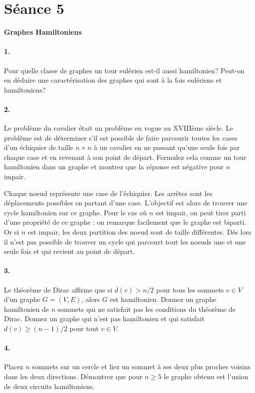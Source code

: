 \section{Séance 5}

\textbf{Graphes Hamiltoniens}

\paragraph{1. } Pour quelle classe de graphes un tour eulérien est-il aussi hamiltonien? Peut-on en déduire une caractérisation des graphes qui sont à la fois eulériens et hamiltoniens?

\paragraph{2. } Le problème du cavalier était un problème en vogue au XVIIIème siècle. Le problème est de déterminer s'il est possible de faire parcourir toutes les cases d'un échiquier de taille $n \times n$ à un cavalier en ne passant qu'une seule fois par chaque case et en revenant à son point de départ. Formulez cela comme un tour hamiltonien dans un graphe et montrez que la réponse est négative pour $n$ impair.
\begin{solution}
Chaque noeud représente une case de l'échiquier. Les arrêtes sont les déplacements possibles en partant d'une case. L'objectif est alors de trouver une cycle hamiltonien sur ce graphe. Pour le cas où $n$ est impair, on peut tirer parti d'une propriété de ce graphe : on remarque facilement que le graphe est biparti. Or si $n$ est impair, les deux partition des noeud sont de taille différentes. Dés lors il n'est pas possible de trouver un cycle qui parcourt tout les noeuds une et une seule fois et qui revient au point de départ.
\end{solution}

\paragraph{3. } Le théorème de Dirac affirme que si $d(v) > n/2$ pour tous les sommets $v \in V$ d'un graphe $G=(V,E)$, alors $G$ est hamiltonien. Donnez un graphe hamiltonien de $n$ sommets qui ne satisfait pas les conditions du théorème de Dirac. Donnez un graphe qui n'est pas hamiltonien et qui satisfait $d(v) \geq (n-1)/2$ pour tout $v \in V$.

\paragraph{4. } Placez $n$ sommets sur un cercle et liez un sommet à ses deux plus proches voisins dans les deux directions. Démontrez que pour $n \geq 5$ le graphe obtenu est l'union de deux circuits hamiltoniens.

